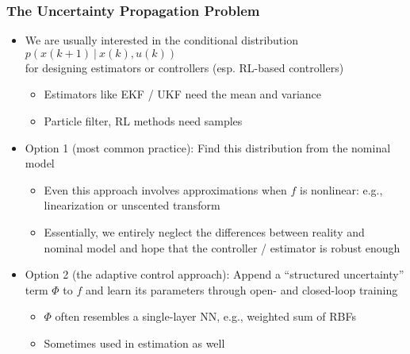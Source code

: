 \documentclass[aspectratio=169,handout]{beamer} 	%
\begin{document}
\begin{frame}
	\frametitle{The Uncertainty Propagation Problem}
	\begin{itemize}[<+->]
		\itemsep\baselineskip
		\item We are usually interested in the conditional distribution
		$p(x(k + 1) ~|~ x(k), u(k))$ \\
		for designing estimators or controllers (esp. RL-based controllers)
		\begin{itemize}
			\item Estimators like EKF / UKF need the mean and variance
			\item Particle filter, RL methods need samples 
		\end{itemize}
		
		\item \alert{Option 1} (most common practice): Find this distribution 
		from the nominal model
		\begin{itemize}
			\item Even this approach involves approximations when $f$ is nonlinear:
			e.g., linearization or unscented transform
			\item Essentially, we entirely neglect the differences between reality 
			and nominal model and hope that the controller / estimator is robust enough
		\end{itemize}
		
		\item \alert{Option 2} (the adaptive control approach): Append a ``structured
		uncertainty'' term $\Phi$ to $f$ and learn its parameters through open- and 
		closed-loop training
		\begin{itemize}
			\item $\Phi$ often resembles a single-layer NN, e.g., weighted sum of RBFs
			
			\item Sometimes used in estimation as well
					
		\end{itemize}
		
	\end{itemize}
	
\end{frame}
\end{document}
